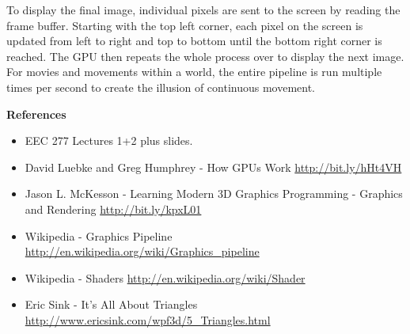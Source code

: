 \documentclass[12pt] {article}
\begin{document}
To display the final image, individual pixels are sent to the screen by reading the frame buffer. Starting with the top left corner, each pixel on the screen is updated from left to right and top to bottom until the bottom right corner is reached. The GPU then repeats the whole process over to display the next image. For movies and movements within a world, the entire pipeline is run multiple times per second to create the illusion of continuous movement.


\clearpage
\large \bf {References}
\medskip

\normalsize
\begin{itemize}
	
	\item EEC 277 Lectures 1+2 plus slides.
	
	\item David Luebke and Greg Humphrey - How GPUs Work \newline
	\url {http://bit.ly/hHt4VH}
		
	\item Jason L. McKesson - Learning Modern 3D Graphics Programming - Graphics and Rendering \newline
	\url {http://bit.ly/kpxL01}
		
	\item Wikipedia - Graphics Pipeline \newline
	\url {http://en.wikipedia.org/wiki/Graphics_pipeline}
	
	\item  Wikipedia - Shaders \newline
	\url {http://en.wikipedia.org/wiki/Shader}
	
	\item  Eric Sink -  It's All About Triangles \newline
	\url {http://www.ericsink.com/wpf3d/5_Triangles.html}	



	
\end{itemize}
\end{document}
